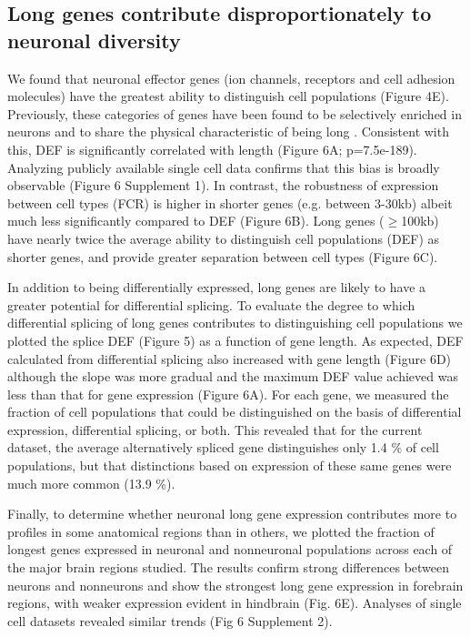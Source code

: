 \subsection{Long genes contribute disproportionately to neuronal diversity}

We found that neuronal effector genes (ion channels, receptors and cell adhesion molecules) have the greatest ability to distinguish cell populations (Figure 4E). Previously, these categories of genes have been found to be selectively enriched in neurons and to share the physical characteristic of being long \citep{Sugino_2014,Gabel_2015,Zylka_2015}. Consistent with this, DEF is significantly correlated with length (Figure 6A; p=7.5e-189). Analyzing publicly available single cell data confirms that this bias is broadly observable (Figure 6 Supplement 1). In contrast, the robustness of expression between cell types (FCR) is higher in shorter genes (e.g. between 3-30kb) albeit much less significantly compared to DEF (Figure 6B). Long genes ($\geq$100kb) have nearly twice the average ability to distinguish cell populations (DEF) as shorter genes, and provide greater separation between cell types (Figure 6C).  

In addition to being differentially expressed, long genes are likely to have a greater potential for differential splicing. To evaluate the degree to which differential splicing of long genes contributes to distinguishing cell populations we plotted the splice DEF (Figure 5) as a function of gene length. %
As expected, DEF calculated from differential splicing also increased with gene length (Figure 6D) although the slope was more gradual and the maximum DEF value achieved was less than that for gene expression (Figure 6A). For each gene, we measured the fraction of cell populations that could be distinguished on the basis of differential expression, differential splicing, or both. This revealed that for the current dataset, the average alternatively spliced gene distinguishes only 1.4 \% of cell populations, but that distinctions based on expression of these same genes were much more common (13.9 \%).  

Finally, to determine whether neuronal long gene expression contributes more to profiles in some anatomical regions than in others, we plotted the fraction of longest genes expressed in neuronal and nonneuronal populations across each of the major brain regions studied. The results confirm strong differences between neurons and nonneurons and show the strongest long gene expression in forebrain regions, with weaker expression evident in hindbrain (Fig. 6E). Analyses of single cell datasets revealed similar trends (Fig 6 Supplement 2).

